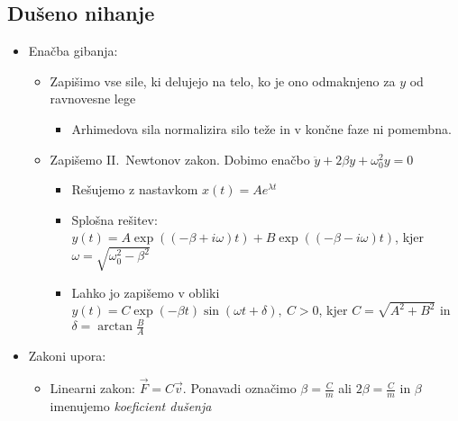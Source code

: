 \newpage
\subsection{Dušeno nihanje}
\begin{itemize}
    \item Enačba gibanja:
    \begin{itemize}
        \item Zapišimo vse sile, ki delujejo na telo, ko je ono odmaknjeno za \(y\) od ravnovesne lege
        \begin{itemize}
            \item Arhimedova sila normalizira silo teže in v končne faze ni pomembna.
        \end{itemize}
        \item Zapišemo II.\ Newtonov zakon. Dobimo enačbo \(\ddot{y} + 2\beta y + \omega_0^2y = 0\)
        \begin{itemize}
            \item Rešujemo z nastavkom \(x(t) = A e^{\lambda t}\)
            \item Splošna rešitev: \(y(t) = A \exp ((-\beta + i \omega)t) + B \exp ((-\beta - i \omega)t)\), kjer \(\omega = \sqrt{\omega_0^2 - \beta^2}\)
            \item Lahko jo zapišemo v obliki \(y(t) = C \exp(-\beta t) \sin(\omega t + \delta), \ C > 0\), kjer \(C = \sqrt{A^2 + B^2}\) in \(\delta = \arctan \frac{B}{A}\)
        \end{itemize}
    \end{itemize}
    \item Zakoni upora:
    \begin{itemize}
        \item Linearni zakon: \(\vec{F} = C \vec{v}\). Ponavadi označimo \(\beta = \frac{C}{m}\) ali \(2 \beta = \frac{C}{m}\) in \(\beta\) imenujemo \emph{koeficient dušenja}
    \end{itemize}
\end{itemize}

